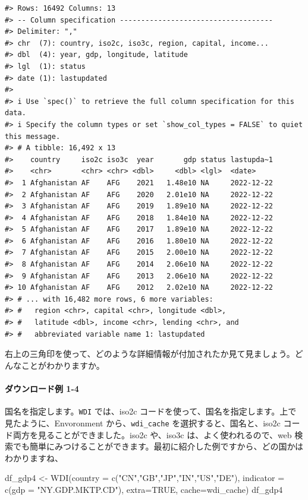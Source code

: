\documentclass[
]{bxjsbook}
\newenvironment{Shaded}{\begin{snugshade}}{\end{snugshade}}
\newcommand{\AttributeTok}[1]{\textcolor[rgb]{0.77,0.63,0.00}{#1}}
\newcommand{\ConstantTok}[1]{\textcolor[rgb]{0.00,0.00,0.00}{#1}}
\newcommand{\FunctionTok}[1]{\textcolor[rgb]{0.00,0.00,0.00}{#1}}
\newcommand{\NormalTok}[1]{#1}
\newcommand{\OtherTok}[1]{\textcolor[rgb]{0.56,0.35,0.01}{#1}}
\newcommand{\StringTok}[1]{\textcolor[rgb]{0.31,0.60,0.02}{#1}}
\theoremstyle{definition}
\theoremstyle{definition}
\theoremstyle{definition}
\theoremstyle{definition}
\theoremstyle{remark}
\begin{document}
\begin{verbatim}
#> Rows: 16492 Columns: 13
#> -- Column specification ------------------------------------
#> Delimiter: ","
#> chr  (7): country, iso2c, iso3c, region, capital, income...
#> dbl  (4): year, gdp, longitude, latitude
#> lgl  (1): status
#> date (1): lastupdated
#> 
#> i Use `spec()` to retrieve the full column specification for this data.
#> i Specify the column types or set `show_col_types = FALSE` to quiet this message.
#> # A tibble: 16,492 x 13
#>    country     iso2c iso3c  year       gdp status lastupda~1
#>    <chr>       <chr> <chr> <dbl>     <dbl> <lgl>  <date>    
#>  1 Afghanistan AF    AFG    2021   1.48e10 NA     2022-12-22
#>  2 Afghanistan AF    AFG    2020   2.01e10 NA     2022-12-22
#>  3 Afghanistan AF    AFG    2019   1.89e10 NA     2022-12-22
#>  4 Afghanistan AF    AFG    2018   1.84e10 NA     2022-12-22
#>  5 Afghanistan AF    AFG    2017   1.89e10 NA     2022-12-22
#>  6 Afghanistan AF    AFG    2016   1.80e10 NA     2022-12-22
#>  7 Afghanistan AF    AFG    2015   2.00e10 NA     2022-12-22
#>  8 Afghanistan AF    AFG    2014   2.06e10 NA     2022-12-22
#>  9 Afghanistan AF    AFG    2013   2.06e10 NA     2022-12-22
#> 10 Afghanistan AF    AFG    2012   2.02e10 NA     2022-12-22
#> # ... with 16,482 more rows, 6 more variables:
#> #   region <chr>, capital <chr>, longitude <dbl>,
#> #   latitude <dbl>, income <chr>, lending <chr>, and
#> #   abbreviated variable name 1: lastupdated
\end{verbatim}

右上の三角印を使って、どのような詳細情報が付加されたか見て見ましょう。どんなことがわかりますか。

\hypertarget{ux30c0ux30a6ux30f3ux30edux30fcux30c9ux4f8b-1-4}{%
\paragraph{ダウンロード例 1-4}\label{ux30c0ux30a6ux30f3ux30edux30fcux30c9ux4f8b-1-4}}

国名を指定します。\texttt{WDI} では、iso2c コードを使って、国名を指定します。上で見たように、Envoronment から、\texttt{wdi\_cache} を選択すると、国名と、iso2c コード両方を見ることができました。iso2c や、iso3c は、よく使われるので、web 検索でも簡単にみつけることができます。最初に紹介した例ですから、どの国かはわかりますね、

\begin{Shaded}
\begin{Highlighting}[]
\NormalTok{df\_gdp4 }\OtherTok{\textless{}{-}} \FunctionTok{WDI}\NormalTok{(}\AttributeTok{country =} \FunctionTok{c}\NormalTok{(}\StringTok{"CN"}\NormalTok{,}\StringTok{"GB"}\NormalTok{,}\StringTok{"JP"}\NormalTok{,}\StringTok{"IN"}\NormalTok{,}\StringTok{"US"}\NormalTok{,}\StringTok{"DE"}\NormalTok{), }
               \AttributeTok{indicator =} \FunctionTok{c}\NormalTok{(}\AttributeTok{gdp =} \StringTok{"NY.GDP.MKTP.CD"}\NormalTok{), }\AttributeTok{extra=}\ConstantTok{TRUE}\NormalTok{, }\AttributeTok{cache=}\NormalTok{wdi\_cache)}
\NormalTok{df\_gdp4}
\end{Highlighting}
\end{Shaded}
\end{document}
